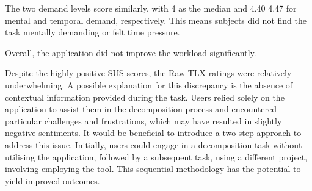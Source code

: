 The two demand levels score similarly, with 4 as the median and 4.40 4.47 for
mental and temporal demand, respectively. This means subjects did not find the
task mentally demanding or felt time pressure.

Overall, the application did not improve the workload significantly.

Despite the highly positive SUS scores, the Raw-TLX ratings were relatively
underwhelming. A possible explanation for this discrepancy is the absence of
contextual information provided during the task. Users relied solely on the
application to assist them in the decomposition process and encountered
particular challenges and frustrations, which may have resulted in slightly
negative sentiments. It would be beneficial to introduce a two-step approach to
address this issue. Initially, users could engage in a decomposition task
without utilising the application, followed by a subsequent task, using a
different project, involving employing the tool. This sequential methodology
has the potential to yield improved outcomes.

